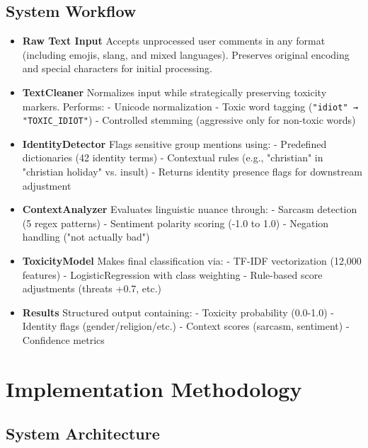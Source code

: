\documentclass[conference]{IEEEtran}
\begin{document}
\subsection{System Workflow}
\label{subsec:workflow}

\begin{itemize}
    \item \textbf{Raw Text Input}  
    Accepts unprocessed user comments in any format (including emojis, slang, and mixed languages). Preserves original encoding and special characters for initial processing.
    
    \item \textbf{TextCleaner}  
    Normalizes input while strategically preserving toxicity markers. Performs:  
    - Unicode normalization  
    - Toxic word tagging (\texttt{"idiot" → "TOXIC\_IDIOT"})  
    - Controlled stemming (aggressive only for non-toxic words)  
    
    \item \textbf{IdentityDetector}  
    Flags sensitive group mentions using:  
    - Predefined dictionaries (42 identity terms)  
    - Contextual rules (e.g., "christian" in "christian holiday" vs. insult)  
    - Returns identity presence flags for downstream adjustment  
    
    \item \textbf{ContextAnalyzer}  
    Evaluates linguistic nuance through:  
    - Sarcasm detection (5 regex patterns)  
    - Sentiment polarity scoring (-1.0 to 1.0)  
    - Negation handling ("not actually bad")  
    
    \item \textbf{ToxicityModel}  
    Makes final classification via:  
    - TF-IDF vectorization (12,000 features)  
    - LogisticRegression with class weighting  
    - Rule-based score adjustments (threats +0.7, etc.)  
    
    \item \textbf{Results}  
    Structured output containing:  
    - Toxicity probability (0.0-1.0)  
    - Identity flags (gender/religion/etc.)  
    - Context scores (sarcasm, sentiment)  
    - Confidence metrics  
\end{itemize}
\section{Implementation Methodology}
\subsection{System Architecture}
\end{document}
